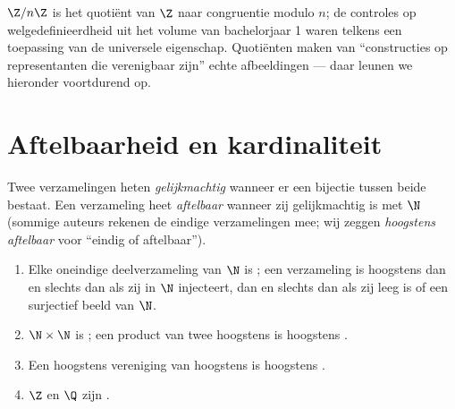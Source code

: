\begin{example}
$\Z/n\Z$ is het quotiënt van $\Z$ naar congruentie modulo $n$; de
controles op welgedefinieerdheid uit het volume van bachelorjaar 1
waren telkens een toepassing van de universele eigenschap.
Quotiënten maken van ``constructies op representanten die
verenigbaar zijn'' echte afbeeldingen --- daar leunen we hieronder
voortdurend op.
\end{example}

\section{Aftelbaarheid en kardinaliteit}

\begin{definition}\label{def:b2:structures:countable}
Twee verzamelingen heten \emph{gelijkmachtig}
wanneer er een bijectie tussen beide bestaat. Een verzameling heet
\emph{aftelbaar} wanneer zij
gelijkmachtig is met $\N$ (sommige auteurs rekenen de eindige
verzamelingen mee; wij zeggen \emph{hoogstens aftelbaar} voor
``eindig of aftelbaar'').
\end{definition}

\begin{proposition}[Stabiliteitseigenschappen]\label{prop:b2:structures:countablestable}
\begin{enumerate}
  \item Elke oneindige deelverzameling van $\N$ is ; een
        verzameling is hoogstens  dan en slechts dan als
        zij in $\N$ injecteert, dan en slechts dan als zij leeg is
        of een surjectief beeld van $\N$.
  \item $\N \times \N$ is ; een product van twee hoogstens
         is hoogstens .
  \item Een hoogstens  vereniging van hoogstens  is hoogstens .
  \item $\Z$ en $\Q$ zijn .
\end{enumerate}
\end{proposition}

